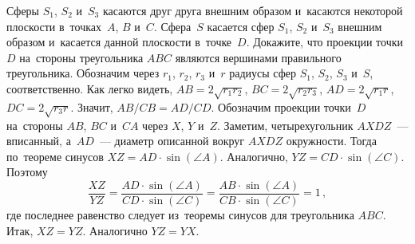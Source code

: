 \problem{}
Сферы $S_1$, $S_2$ и~$S_3$ касаются друг друга внешним образом и~касаются
некоторой плоскости в~точках~$A$, $B$ и~$C$.
Сфера~$S$ касается сфер $S_1$, $S_2$ и~$S_3$ внешним образом и~касается данной
плоскости в~точке~$D$.
Докажите, что проекции точки~$D$ на~стороны треугольника $ABC$ являются
вершинами правильного треугольника.
\solution
\label{2014/ru/team/senior/5:solution}%
Обозначим через $r_1$, $r_2$, $r_3$ и~$r$ радиусы сфер
$S_1$, $S_2$, $S_3$ и~$S$, соответственно.
Как легко видеть, $AB = 2 \sqrt{r_1 r_2}$, $BC = 2 \sqrt{r_2 r_3}$,
$AD = 2 \sqrt{r_1 r}$, $DC = 2 \sqrt{r_3 r}$.
Значит, $AB / CB = AD / CD$.
Обозначим проекции точки~$D$ на~стороны $AB$, $BC$ и~$CA$ через $X$, $Y$ и~$Z$.
Заметим, четырехугольник $AXDZ$~--- вписанный, а~$AD$~--- диаметр описанной
вокруг $AXDZ$ окружности.
Тогда по~теореме синусов $XZ = AD \cdot \sin(\angle A)$.
Аналогично, $YZ = CD \cdot \sin(\angle{C})$.
Поэтому
\[
    \frac{XZ}{YZ}
=
    \frac{
        AD \cdot \sin(\angle A)
    }{
        CD \cdot \sin(\angle C)
    }
=
    \frac{
        AB \cdot \sin(\angle A)
    }{
        CB \cdot \sin(\angle C)
    }
=
    1
\, , \]
где последнее равенство следует из~теоремы синусов для треугольника $ABC$.
Итак, $XZ = YZ$.
Аналогично $YZ = YX$.
\endproblem
